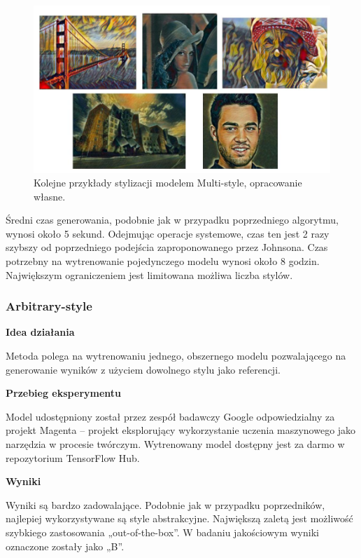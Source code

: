\documentclass[12pt]{article}
\begin{document}
\begin{figure}[H]
    \centering
    \includegraphics[width=\textwidth]{u25.png}
    \caption{Kolejne przykłady stylizacji modelem Multi-style, opracowanie własne.}
    \label{fig:16:2}
\end{figure}

Średni czas generowania, podobnie jak w przypadku poprzedniego algorytmu, wynosi około 5 sekund. Odejmując operacje systemowe, czas ten jest 2 razy szybszy od poprzedniego podejścia zaproponowanego przez Johnsona. Czas potrzebny na wytrenowanie pojedynczego modelu wynosi około 8 godzin. Największym ograniczeniem jest limitowana możliwa liczba stylów.

\subsubsection{Arbitrary-style}

\noindent\textbf{Idea działania}

Metoda polega na wytrenowaniu jednego, obszernego modelu pozwalającego na generowanie wyników z użyciem dowolnego stylu jako referencji.

\noindent\textbf{Przebieg eksperymentu}

Model udostępniony został przez zespół badawczy Google odpowiedzialny za projekt Magenta – projekt eksplorujący wykorzystanie uczenia maszynowego jako narzędzia w procesie twórczym. Wytrenowany model dostępny jest za darmo w repozytorium TensorFlow Hub.

\noindent\textbf{Wyniki}

Wyniki są bardzo zadowalające. Podobnie jak w przypadku poprzedników, najlepiej wykorzystywane są style abstrakcyjne. Największą zaletą jest możliwość szybkiego zastosowania „out-of-the-box”. W badaniu jakościowym wyniki oznaczone zostały jako „B”.
\end{document}
